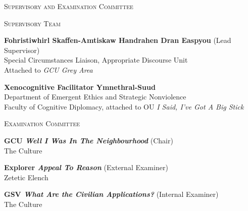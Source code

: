 \cleardoublepageforprint	%

{}

{\LARGE\textsc{Supervisory and Examination Committee}}

\par \vspace{5mm}

{\large\textsc{Supervisory Team}}

\par \vspace{0.7em}

\begin{spacing}{1}
	
	\textbf{Fohristiwhirl Skaffen-Amtiskaw Handrahen Dran Easpyou} (Lead Supervisor)\\
	Special Circumstances Liaison, Appropriate Discourse Unit\\
	Attached to \textit{GCU Grey Area}
	
	\par \vspace{1em}
	
	\textbf{Xenocognitive Facilitator Ymnethral-Suud}\\
	Department of Emergent Ethics and Strategic Nonviolence\\
	Faculty of Cognitive Diplomacy, attached to OU \textit{{\tiny I Said, I've Got A Big Stick}}
	
\end{spacing}

\par \vspace{5em}

{\large\textsc{Examination Committee}}

\par \vspace{0.7em}

\begin{spacing}{1}
	
	\textbf{GCU \textit{Well I Was In The Neighbourhood}} (Chair)\\
	The Culture

	\par \vspace{1em}

	\textbf{Explorer \textit{Appeal To Reason}} (External Examiner)\\
	Zetetic Elench


	\par \vspace{1em}
	
	\textbf{GSV \textit{What Are the Civilian Applications?}} (Internal Examiner)\\
	The Culture

\end{spacing}
